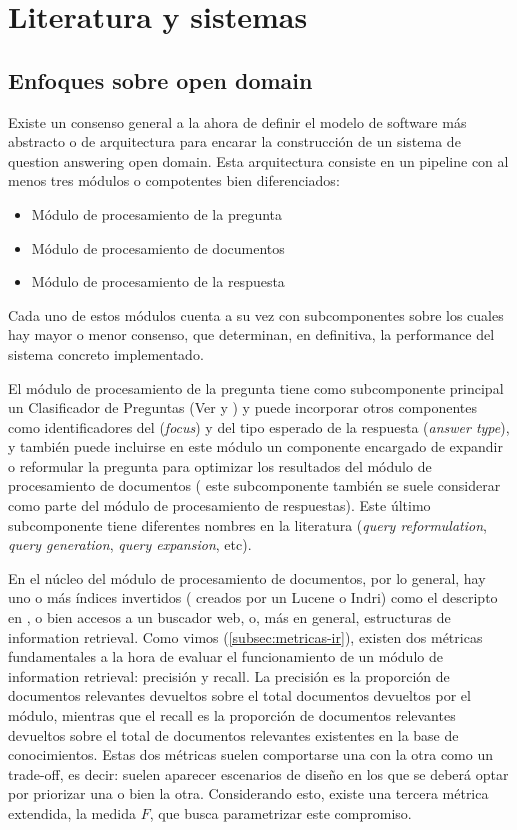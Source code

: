 \section{Literatura y sistemas}
\label{sec:literatura}
\subsection{Enfoques sobre open domain}
\label{subsec:open-domain}
\falta
Existe un consenso general a la ahora de definir el modelo de software más abstracto o de arquitectura para encarar la construcción de un sistema de question answering open domain. Esta arquitectura consiste en un pipeline con al menos tres módulos o compotentes bien diferenciados:
\begin{itemize}
\item Módulo de procesamiento de la pregunta
\item Módulo de procesamiento de documentos
\item Módulo de procesamiento de la respuesta
\end{itemize}

Cada uno de estos módulos cuenta a su vez con subcomponentes sobre los cuales hay mayor o menor consenso, que determinan, en definitiva, la performance del sistema concreto implementado. 

El módulo de procesamiento de la pregunta tiene como subcomponente principal un Clasificador de Preguntas (Ver  y ) y puede incorporar otros componentes como identificadores del  (\textit{focus}) y del tipo esperado de la respuesta (\textit{answer type}), y también puede incluirse en este módulo un componente encargado de expandir o reformular la pregunta para optimizar los resultados del módulo de procesamiento de documentos ( este subcomponente también se suele considerar como parte del módulo de procesamiento de respuestas). Este último subcomponente tiene diferentes nombres en la literatura (\textit{query reformulation}, \textit{query generation}, \textit{query expansion}, etc).

En el núcleo del módulo de procesamiento de documentos, por lo general, hay uno o más índices invertidos ( creados por un Lucene o Indri) como el descripto en , o bien accesos a un buscador web, o, más en general, estructuras de information retrieval. Como vimos (\ref{subsec:metricas-ir}), existen dos métricas fundamentales a la hora de evaluar el funcionamiento de un módulo de information retrieval: precisión y recall. La precisión es la proporción de documentos relevantes devueltos sobre el total documentos devueltos por el módulo, mientras que el recall es la proporción de documentos relevantes devueltos sobre el total de documentos relevantes existentes en la base de conocimientos. Estas dos métricas suelen comportarse una con la otra como un trade-off, es decir: suelen aparecer escenarios de diseño en los que se deberá optar por priorizar una o bien la otra. Considerando esto, existe una tercera métrica extendida, la medida $F$, que busca parametrizar este compromiso. 

